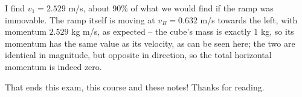 \documentclass[8.01x]{subfiles}
\begin{document}
I find $v_1 = 2.529$ m/s, about 90\% of what we would find if the ramp was immovable. The ramp itself is moving at $v_B = 0.632$ m/s towards the left, with momentum $2.529$ kg m/s, as expected -- the cube's mass is exactly 1 kg, so its momentum has the same value as its velocity, as can be seen here; the two are identical in magnitude, but opposite in direction, so the total horizontal momentum is indeed zero.

That ends this exam, this course and these notes! Thanks for reading.
\end{document}
